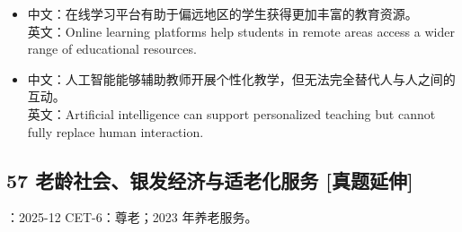 \documentclass[a4paper,11pt,UTF8,fontset=none]{ctexart}
\begin{document}
\par

\begin{itemize}[leftmargin=1.7em,itemsep=1pt,parsep=0pt,topsep=2pt]
\item \noindent 中文：在线学习平台有助于偏远地区的学生获得更加丰富的教育资源。\\ 英文：Online learning platforms help students in remote areas access a wider range of educational resources.\par


\item \noindent 中文：人工智能能够辅助教师开展个性化教学，但无法完全替代人与人之间的互动。\\ 英文：Artificial intelligence can support personalized teaching but cannot fully replace human interaction.\par


\end{itemize}

\subsection{57 老龄社会、银发经济与适老化服务 {\color{AccentBlue} [真题延伸]}}

\begin{tcolorbox}[enhanced,breakable,boxrule=0.35pt,colback=VeryPaleBlue,colframe=AccentBlue!40,left=7pt,right=7pt,top=4pt,bottom=4pt,borderline west={2pt}{0pt}{AccentBlue},before skip=4pt,after skip=6pt]
：2025-12 CET-6：尊老；2023 年养老服务。\par


\end{tcolorbox}
\end{document}
